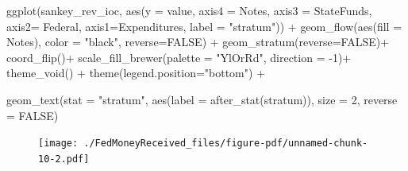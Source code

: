 \documentclass[
  letterpaper,
  DIV=11,
  numbers=noendperiod]{scrreport}
\newenvironment{Shaded}{\begin{snugshade}}{\end{snugshade}}
\newcommand{\AttributeTok}[1]{\textcolor[rgb]{0.40,0.45,0.13}{#1}}
\newcommand{\ConstantTok}[1]{\textcolor[rgb]{0.56,0.35,0.01}{#1}}
\newcommand{\DecValTok}[1]{\textcolor[rgb]{0.68,0.00,0.00}{#1}}
\newcommand{\FunctionTok}[1]{\textcolor[rgb]{0.28,0.35,0.67}{#1}}
\newcommand{\NormalTok}[1]{\textcolor[rgb]{0.00,0.23,0.31}{#1}}
\newcommand{\SpecialCharTok}[1]{\textcolor[rgb]{0.37,0.37,0.37}{#1}}
\newcommand{\StringTok}[1]{\textcolor[rgb]{0.13,0.47,0.30}{#1}}
\begin{document}
\begin{Shaded}
\begin{Highlighting}[]
\FunctionTok{ggplot}\NormalTok{(sankey\_rev\_ioc, }
       \FunctionTok{aes}\NormalTok{(}\AttributeTok{y =}\NormalTok{ value, }
           \AttributeTok{axis4 =}\NormalTok{ Notes, }\AttributeTok{axis3 =}\NormalTok{ StateFunds, }\AttributeTok{axis2=}\NormalTok{ Federal, }\AttributeTok{axis1=}\NormalTok{Expenditures, }\AttributeTok{label =} \StringTok{"stratum"}\NormalTok{)) }\SpecialCharTok{+}
  \FunctionTok{geom\_flow}\NormalTok{(}\FunctionTok{aes}\NormalTok{(}\AttributeTok{fill =}\NormalTok{ Notes), }\AttributeTok{color =} \StringTok{"black"}\NormalTok{, }\AttributeTok{reverse=}\ConstantTok{FALSE}\NormalTok{) }\SpecialCharTok{+}
  \FunctionTok{geom\_stratum}\NormalTok{(}\AttributeTok{reverse=}\ConstantTok{FALSE}\NormalTok{)}\SpecialCharTok{+}
\FunctionTok{coord\_flip}\NormalTok{()}\SpecialCharTok{+}
   \FunctionTok{scale\_fill\_brewer}\NormalTok{(}\AttributeTok{palette =} \StringTok{"YlOrRd"}\NormalTok{, }\AttributeTok{direction =} \SpecialCharTok{{-}}\DecValTok{1}\NormalTok{)}\SpecialCharTok{+}
  \FunctionTok{theme\_void}\NormalTok{() }\SpecialCharTok{+}
  \FunctionTok{theme}\NormalTok{(}\AttributeTok{legend.position=}\StringTok{"bottom"}\NormalTok{) }\SpecialCharTok{+}

      \FunctionTok{geom\_text}\NormalTok{(}\AttributeTok{stat =} \StringTok{"stratum"}\NormalTok{, }\FunctionTok{aes}\NormalTok{(}\AttributeTok{label =} \FunctionTok{after\_stat}\NormalTok{(stratum)), }\AttributeTok{size =} \DecValTok{2}\NormalTok{, }\AttributeTok{reverse =} \ConstantTok{FALSE}\NormalTok{)}
\end{Highlighting}
\end{Shaded}

\begin{figure}[H]

{\centering \texttt{[image: ./FedMoneyReceived\_files/figure-pdf/unnamed-chunk-10-2.pdf]}

}

\end{figure}
\end{document}
